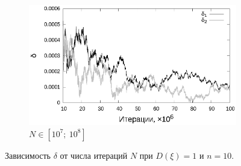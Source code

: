 \documentclass[11pt,a4paper]{article}
\theoremstyle{definition}
\begin{document}
\begin{figure}[h!]
\begin{subfigure}[b]{0.3\textwidth}
    \includegraphics[width=\textwidth]{figs/classic/linear_log_1x_2_samples_10_variance_1_norm.log_end.eps}
    \caption{$N \in [10^7;~10^8]$}
    \label{fig:classic_var1_n10_end}
  \end{subfigure}
  \caption{Зависимость $\delta$ от числа итераций $N$ при $D(\xi) = 1$ и $n = 10$.}
  \label{fig:classic_var1_n10}
\end{figure}
\end{document}
